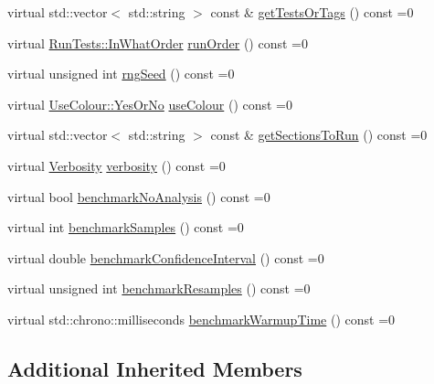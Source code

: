 \begin{DoxyCompactItemize}
\item 
virtual std\+::vector$<$ std\+::string $>$ const  \& \mbox{\hyperlink{struct_catch_1_1_i_config_a1b8a299344a493eb98c12faae48421d7}{get\+Tests\+Or\+Tags}} () const =0
\item 
virtual \mbox{\hyperlink{struct_catch_1_1_run_tests_ab56bd851b1dd085869992d1a9d73dc5d}{Run\+Tests\+::\+In\+What\+Order}} \mbox{\hyperlink{struct_catch_1_1_i_config_a0fc59c9aba1d4018538d5526daa5eb78}{run\+Order}} () const =0
\item 
virtual unsigned int \mbox{\hyperlink{struct_catch_1_1_i_config_ae049eb45979d841073fa65d1094c7f14}{rng\+Seed}} () const =0
\item 
virtual \mbox{\hyperlink{struct_catch_1_1_use_colour_a6aa78da0c2de7539bb9e3757e204a3f1}{Use\+Colour\+::\+Yes\+Or\+No}} \mbox{\hyperlink{struct_catch_1_1_i_config_a87ec19a6b486eb5b5015cf7738fee026}{use\+Colour}} () const =0
\item 
virtual std\+::vector$<$ std\+::string $>$ const  \& \mbox{\hyperlink{struct_catch_1_1_i_config_afc801995e115557f90e41f3d6e96908d}{get\+Sections\+To\+Run}} () const =0
\item 
virtual \mbox{\hyperlink{namespace_catch_af85c0d46dfe687d923a157362fd07737}{Verbosity}} \mbox{\hyperlink{struct_catch_1_1_i_config_a55aff5924bdbb3f558775821b1eb4b3d}{verbosity}} () const =0
\item 
virtual bool \mbox{\hyperlink{struct_catch_1_1_i_config_aa9aa1eafdbe510e27bf319233969ee2c}{benchmark\+No\+Analysis}} () const =0
\item 
virtual int \mbox{\hyperlink{struct_catch_1_1_i_config_a583734a61796b495b80779a6540eb6cc}{benchmark\+Samples}} () const =0
\item 
virtual double \mbox{\hyperlink{struct_catch_1_1_i_config_ae1ec73d460a2b58c7c9b022a430a34dd}{benchmark\+Confidence\+Interval}} () const =0
\item 
virtual unsigned int \mbox{\hyperlink{struct_catch_1_1_i_config_a3b8e5581be01f4773593f8b85eb7db98}{benchmark\+Resamples}} () const =0
\item 
virtual std\+::chrono\+::milliseconds \mbox{\hyperlink{struct_catch_1_1_i_config_a516879e39f2e46f69bb4ef1f1fe7023c}{benchmark\+Warmup\+Time}} () const =0
\end{DoxyCompactItemize}
\subsection*{Additional Inherited Members}


